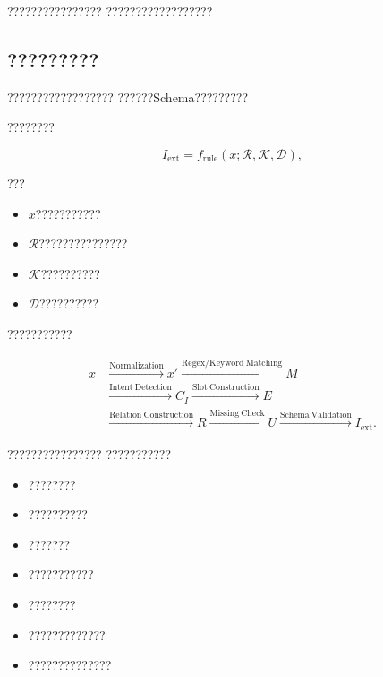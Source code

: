 ????????????????
??????????????????


\subsection*{?????????}

??????????????????
??????Schema?????????

????????

\begin{equation}
I_{\mathrm{ext}}
=
f_{\mathrm{rule}}
\left(
x;
\mathcal{R},
\mathcal{K},
\mathcal{D}
\right),
\label{eq:rule_based_intent_extraction}
\end{equation}

???

\begin{itemize}
    \item $x$???????????
    \item $\mathcal{R}$???????????????
    \item $\mathcal{K}$??????????
    \item $\mathcal{D}$??????????
\end{itemize}

???????????

\begin{equation}
\begin{aligned}
x
&\xrightarrow{\mathrm{Normalization}}
x'
\xrightarrow{\mathrm{Regex/Keyword\ Matching}}
M
\\
&\xrightarrow{\mathrm{Intent\ Detection}}
C_I
\xrightarrow{\mathrm{Slot\ Construction}}
E
\\
&\xrightarrow{\mathrm{Relation\ Construction}}
R
\xrightarrow{\mathrm{Missing\ Check}}
U
\xrightarrow{\mathrm{Schema\ Validation}}
I_{\mathrm{ext}}.
\end{aligned}
\label{eq:intent_extraction_flow}
\end{equation}

????????????????
???????????

\begin{itemize}
    \item ????????
    \item ??????????
    \item ???????
    \item ???????????
    \item ????????
    \item ?????????????
    \item ??????????????
\end{itemize}

